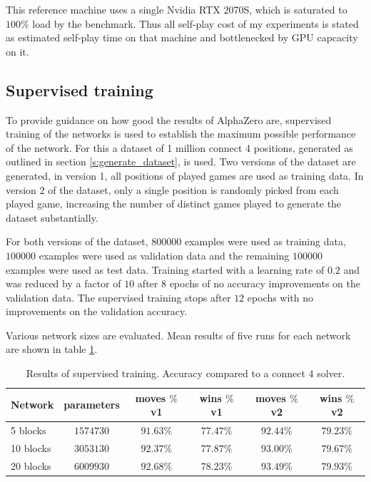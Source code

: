 \documentclass[12pt,onecolumn,oneside,titlepage]{article}
\begin{document}
This reference machine uses a single Nvidia RTX 2070S, which is saturated to $100\%$ load by the benchmark. Thus all self-play cost of my experiments is stated as estimated self-play time on that machine and bottlenecked by GPU capcacity on it.

\subsection{Supervised training}

To provide guidance on how good the results of AlphaZero are, supervised training of the networks is used to establish the maximum possible performance of the network.
For this a dataset of 1 million connect 4 positions, generated as outlined in section \ref{s:generate_dataset}, is used. Two versions of the dataset are generated, in version 1, all positions of played games are used as training data.
In version 2 of the dataset, only a single position is randomly picked from each played game, increasing the number of distinct games played to generate the dataset substantially.

For both versions of the dataset, $800000$ examples were used as training data, $100000$ examples were used as validation data and the remaining $100000$ examples were used as test data.
Training started with a learning rate of $0.2$ and was reduced by a factor of $10$ after $8$ epochs of no accuracy improvements on the validation data. The supervised training stops after $12$ epochs with no improvements on the validation accuracy.

Various network sizes are evaluated. Mean results of five runs for each network are shown in table \ref{t:supervised_results}.

\begin{table} [H]
 \centering
  \begin{tabular}{ l | c c c c c }
  Network & parameters & moves $\%$ v1 & wins $\%$ v1 & moves $\%$ v2 & wins $\%$ v2 \\
  \hline
  5 blocks & $1574730$ & $91.63\%$ & $77.47\%$ & $92.44\%$ & $79.23\%$ \\
  10 blocks & $3053130$ & $92.37\%$ & $77.87\%$ & $93.00\%$ & $79.67\%$ \\
  20 blocks & $6009930$ & $92.68\%$ & $78.23\%$ & $93.49\%$ & $79.93\%$ \\
  \end{tabular}
  \caption{Results of supervised training. Accuracy compared to a connect 4 solver.}
  \label{t:supervised_results}
\end{table}
\end{document}
